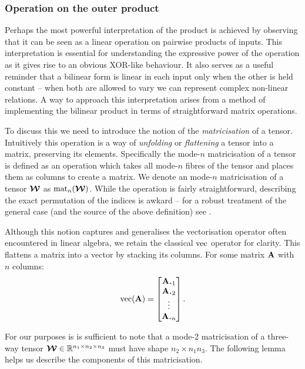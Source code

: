 {\subsubsection{Operation on the outer product}
Perhaps the most powerful interpretation of the product is achieved by observing that it can be
seen as a linear operation on pairwise products of inputs.
This interpretation is essential for understanding the expressive
power of the operation as it gives rise to an obvious XOR-like behaviour. It also serves
as a useful reminder that a bilinear form is linear in each input only when the other
is held constant -- when both are allowed to vary we can represent complex non-linear
relations.
A way to approach this interpretation arises from a method of implementing the bilinear 
product in terms of straightforward matrix operations.

To discuss
this we need to introduce the notion of the \emph{matricisation} of a tensor. Intuitively this
operation is a way of \emph{unfolding} or \emph{flattening} a tensor into a matrix,
preserving its elements. Specifically the mode-\(n\)
matricisation of a tensor is defined as an operation which takes all mode-\(n\) fibres
of the tensor and places them as columns to create a matrix. We denote an mode-\(n\)
matricisation of a tensor \(\bm{\mathcal{W}}\) as \(\operatorname{mat}_n(\bm{\mathcal{W}})\). While the operation is
fairly straightforward, describing the exact permutation of the indices is awkard -- 
for a robust treatment of the general case (and the source of the above definition) see
\autocite{Kolda2009}. 

Although this notion captures and generalises the vectorisation operator often
encountered in linear algebra, we retain the classical \(\operatorname{vec}\) operator for clarity.
This flattens a matrix into a vector by stacking its columns. For some matrix \(\mathbf{A}\) with
\(n\) columns:
\begin{equation}\label{eq:vec}
	\vect(\mat{A}) = \begin{bmatrix}
		\vec{A}_{\midbullet 1}\\
		\vec{A}_{\midbullet 2}\\
		\vdots\\
		\vec{A}_{\midbullet n}
	\end{bmatrix}.
\end{equation}

For our purposes is is sufficient to note that a 
mode-2 matricisation of a
three-way tensor \(\bm{\mathcal{W}} \in \mathbb{R}^{n_1\times n_2\times n_3}\) must have shape
\(n_2 \times n_1n_3\). The following lemma helps us describe the components of this matricisation.

}

